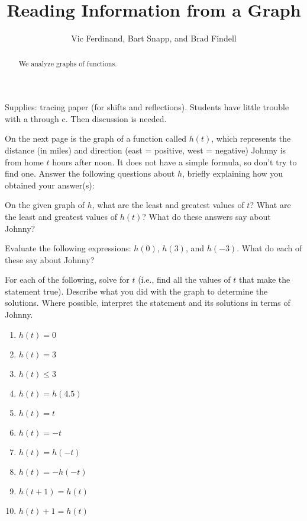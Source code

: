 \documentclass[nooutcomes]{ximera}
\title{Reading Information from a Graph}
\author{Vic Ferdinand, Bart Snapp, and Brad Findell}
\begin{document}
\begin{abstract}
  We analyze graphs of functions.
\end{abstract}
\maketitle


\begin{teachingnote}
Supplies:  tracing paper (for shifts and reflections).  
Students have little trouble with a through c.  Then discussion is needed. 
\end{teachingnote}

On the next page is the graph of a function called $h(t)$, which
represents the distance (in miles) and direction (east = positive,
west = negative) Johnny is from home $t$ hours after noon. It does not
have a simple formula, so don't try to find one. Answer the following
questions about $h$, briefly explaining how you obtained your
answer(s):

\begin{problem}
On the given graph of $h$, what are the least and greatest values
of $t$? What are the least and greatest values of $h(t)$? What do
these answers say about Johnny?
\end{problem}

\begin{problem}
Evaluate the following expressions: $h(0)$, $h(3)$, and $h(-3)$. What
do each of these say about Johnny? 
\end{problem}

\begin{problem}
For each of the following, solve for $t$ (i.e., find all the values of
$t$ that make the statement true). Describe what you did with the
graph to determine the solutions.  Where possible, interpret
the statement and its solutions in terms of Johnny.

\begin{enumerate}
\item $h(t) = 0$
\item $h(t) = 3$
\item $h(t) \leq 3$
\item $h(t) = h(4.5)$
\item $h(t) = t$
\item $h(t) = -t$
\item $h(t) = h(-t)$
\item $h(t) = -h(-t)$
\item $h(t+1) = h(t)$
\item $h(t)+1 = h(t)$
\end{enumerate}
\end{problem}

\newpage


\end{document}
